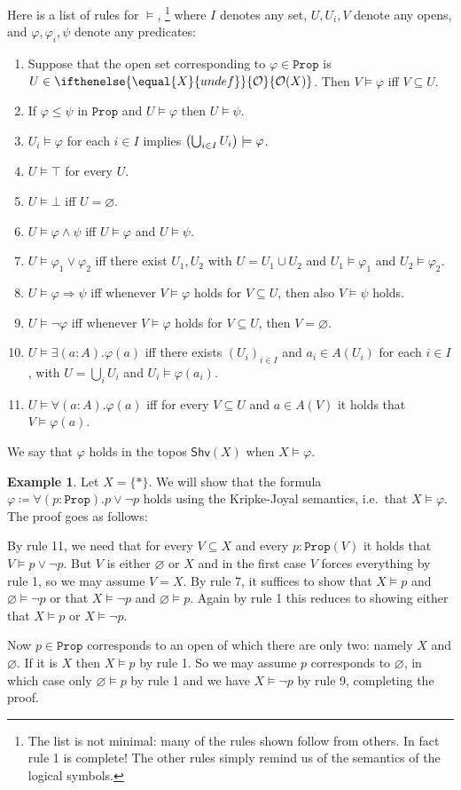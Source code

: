 \documentclass[reqno,11pt]{amsproc}
\theoremstyle{plain}
\theoremstyle{definition}
\newtheorem{example}[theorem]{Example}
\newcommand{\Const}[1]{\mathtt{#1}}
\newcommand{\cat}[1]{\mathsf{#1}}
\newcommand{\shv}{\cat{Shv}}
\newcommand{\prop}{\Const{Prop}}
\newcommand{\Op}[1][undef]{\ifthenelse{\equal{#1}{undef}}{\mathcal{O}}{\mathcal{O}(#1)}}
\newcommand{\imp}{\Rightarrow}
\let\originalleft\left
\let\originalright\right
\renewcommand{\left}{\mathopen{}\mathclose\bgroup\originalleft}
\renewcommand{\right}{\aftergroup\egroup\originalright}
\numberwithin{equation}{section}
\begin{document}
Here is a list of rules for $\models$,%
\footnote{The list is not minimal: many of the rules shown follow from others. In fact rule 1 is complete! The other rules simply remind us of the semantics of the logical symbols.
}
where $I$ denotes any set, $U, U_i, V$ denote any opens, and $\varphi,\varphi_i,\psi$ denote any predicates:
\begin{enumerate}
	\item Suppose that the open set corresponding to $\varphi\in\prop$ is $U\in\Op[X]$. Then $V\models\varphi$ iff $V\subseteq U$.
  \item If $\varphi\le\psi$ in $\prop$ and $U\models\varphi$ then $U\models\psi$.
  \item $U_i\models\varphi$ for each $i\in I$ implies $\left(\bigcup_{i\in I}U_i\right)\models\varphi$.
  \item $U\models\top$ for every $U$.
  \item $U\models\bot$ iff $U=\varnothing$.
  \item $U\models\varphi\wedge\psi$ iff $U\models\varphi$ and $U\models\psi$.
  \item $U\models\varphi_1\lor\varphi_2$ iff there exist $U_1,U_2$ with $U=U_1\cup U_2$ and $U_1\models\varphi_1$ and $U_2\models\varphi_2$.
  \item $U\models \varphi\imp\psi$ iff whenever $V\models\varphi$ holds for $V\subseteq U$, then also $V\models\psi$ holds.
  \item $U\models\neg\varphi$ iff whenever $V\models\varphi$ holds for $V\subseteq U$, then $V=\varnothing$.
  \item $U\models\exists (a:A).\varphi(a)$ iff there exists $(U_i)_{i\in I}$ and $a_i\in A(U_i)$ for each $i\in I$, with $U=\bigcup_iU_i$ and $U_i\models\varphi(a_i)$.
  \item $U\models\forall (a:A).\varphi(a)$ iff for every $V\subseteq U$ and $a\in A(V)$ it holds that $V\models \varphi(a)$.
\end{enumerate}
We say that $\varphi$ holds in the topos $\shv(X)$ when $X\models\varphi$.


\begin{example}
Let $X=\{*\}$. We will show that the formula $\varphi\coloneqq\forall (p:\prop).p\lor\neg p$ holds using the Kripke-Joyal semantics, i.e.\ that $X\models\varphi$. The proof goes as follows:

By rule 11, we need that for every $V\subseteq X$ and every $p:\prop(V)$ it holds that $V\models p\lor\neg p$. But $V$ is either $\varnothing$ or $X$ and in the first case $V$ forces everything by rule 1, so we may assume $V=X$. By rule 7, it suffices to show that $X\models p$ and $\varnothing\models\neg p$ or that $X\models\neg p$ and $\varnothing\models p$. Again by rule 1 this reduces to showing either that $X\models p$ or $X\models\neg p$.

Now $p\in\prop$ corresponds to an open of which there are only two: namely $X$ and $\varnothing$. If it is $X$ then $X\models p$ by rule 1. So we may assume $p$ corresponds to $\varnothing$, in which case only $\varnothing\models p$ by rule 1 and we have $X\models\neg p$ by rule 9, completing the proof.
\end{example}
\end{document}
